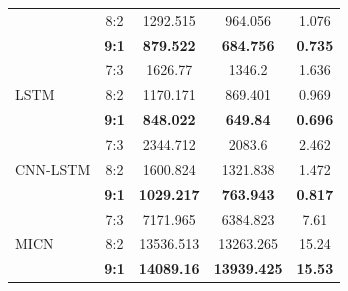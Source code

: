 \documentclass[conference]{IEEEtran}
\begin{document}
\begin{table}[h]
\begin{tabular}{lcccc}
                        & 8:2 & 1292.515 & 964.056 & 1.076 \\
                        & \textbf{9:1} & \textbf{879.522} & \textbf{684.756} & \textbf{0.735} \\ \midrule
\multirow{3}{*}{LSTM} & 7:3 & 1626.77 & 1346.2 & 1.636 \\
                        & 8:2 & 1170.171 & 869.401 & 0.969 \\
                        & \textbf{9:1} & \textbf{848.022} & \textbf{649.84} & \textbf{0.696} \\ \midrule
\multirow{3}{*}{CNN-LSTM} & 7:3 & 2344.712 & 2083.6 & 2.462 \\
                        & 8:2 & 1600.824 & 1321.838 & 1.472 \\
                        & \textbf{9:1} & \textbf{1029.217} & \textbf{763.943} & \textbf{0.817}\\ \midrule
\multirow{3}{*}{MICN} & 7:3 & 7171.965 & 6384.823 & 7.61 \\
                        & 8:2 & 13536.513 & 13263.265 & 15.24 \\
                        & \textbf{9:1} & \textbf{14089.16} & \textbf{13939.425} & \textbf{15.53} \\ \bottomrule
\end{tabular}
\end{table}
\end{document}
